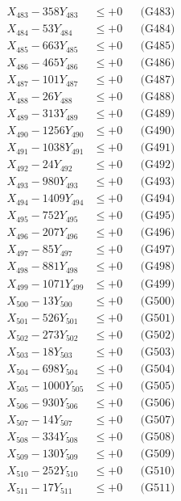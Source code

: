 \documentclass[a4paper,10pt]{article}
\begin{document}
{\begin{align}
X_{483} - 358Y_{483} &\leq +0 && \text{(G483)} \\
X_{484} - 53Y_{484} &\leq +0 && \text{(G484)} \\
X_{485} - 663Y_{485} &\leq +0 && \text{(G485)} \\
X_{486} - 465Y_{486} &\leq +0 && \text{(G486)} \\
X_{487} - 101Y_{487} &\leq +0 && \text{(G487)} \\
X_{488} - 26Y_{488} &\leq +0 && \text{(G488)} \\
X_{489} - 313Y_{489} &\leq +0 && \text{(G489)} \\
X_{490} - 1256Y_{490} &\leq +0 && \text{(G490)} \\
\allowbreak
X_{491} - 1038Y_{491} &\leq +0 && \text{(G491)} \\
X_{492} - 24Y_{492} &\leq +0 && \text{(G492)} \\
X_{493} - 980Y_{493} &\leq +0 && \text{(G493)} \\
X_{494} - 1409Y_{494} &\leq +0 && \text{(G494)} \\
X_{495} - 752Y_{495} &\leq +0 && \text{(G495)} \\
X_{496} - 207Y_{496} &\leq +0 && \text{(G496)} \\
X_{497} - 85Y_{497} &\leq +0 && \text{(G497)} \\
X_{498} - 881Y_{498} &\leq +0 && \text{(G498)} \\
X_{499} - 1071Y_{499} &\leq +0 && \text{(G499)} \\
X_{500} - 13Y_{500} &\leq +0 && \text{(G500)} \\
\allowbreak
X_{501} - 526Y_{501} &\leq +0 && \text{(G501)} \\
X_{502} - 273Y_{502} &\leq +0 && \text{(G502)} \\
X_{503} - 18Y_{503} &\leq +0 && \text{(G503)} \\
X_{504} - 698Y_{504} &\leq +0 && \text{(G504)} \\
X_{505} - 1000Y_{505} &\leq +0 && \text{(G505)} \\
X_{506} - 930Y_{506} &\leq +0 && \text{(G506)} \\
X_{507} - 14Y_{507} &\leq +0 && \text{(G507)} \\
X_{508} - 334Y_{508} &\leq +0 && \text{(G508)} \\
X_{509} - 130Y_{509} &\leq +0 && \text{(G509)} \\
X_{510} - 252Y_{510} &\leq +0 && \text{(G510)} \\
\allowbreak
X_{511} - 17Y_{511} &\leq +0 && \text{(G511)} \\

\end{align}}
\end{document}
